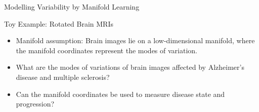 \documentclass{beamer}
\begin{document}
\begin{frame}{Modelling Variability by Manifold Learning}

\begin{block}{Toy Example: Rotated Brain MRIs}
\begin{center}
\end{center}
\end{block}
\begin{itemize}
\item \alert{Manifold assumption:} Brain images lie on a low-dimensional
manifold, where the manifold coordinates represent the modes of variation.
\item[\faQuestionCircle] What are the modes of variations of brain images
affected by Alzheimer's disease and multiple sclerosis?
\item[\faQuestionCircle] Can the manifold coordinates be used to measure disease
state and progression?
\end{itemize}
\end{frame}
\end{document}
